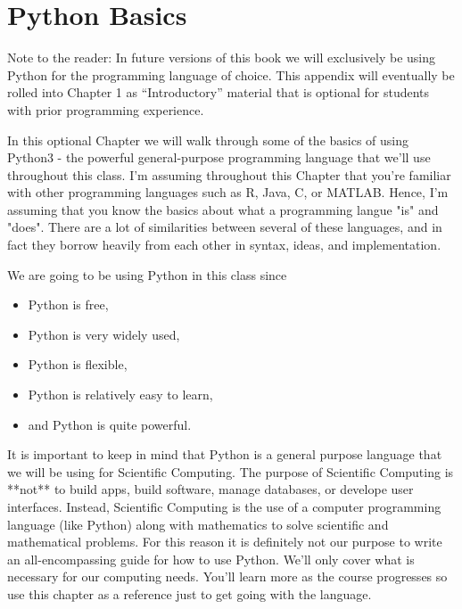 \chapter{Python Basics}\label{app:coding}

Note to the reader: In future versions of this book we will exclusively be using Python
for the programming language of choice.  This appendix will eventually be rolled into
Chapter 1 as ``Introductory'' material that is optional for students with prior
programming experience.

In this optional Chapter we will walk through some of the basics of using Python3 - the powerful general-purpose programming language that we'll use throughout this class.  I'm assuming throughout this Chapter that you're familiar with other programming languages such as R, Java, C, or MATLAB.  Hence, I'm assuming that you know the basics about what a programming langue "is" and "does".  There are a lot of similarities between several of these languages, and in fact they borrow heavily from each other in syntax, ideas, and implementation.

We are going to be using Python in this class since

\begin{itemize}
    \item Python is free,
    \item Python is very widely used,
    \item Python is flexible,
    \item Python is relatively easy to learn,
    \item and Python is quite powerful.
\end{itemize}

It is important to keep in mind that Python is a general purpose language that we will be using for Scientific Computing.  The purpose of Scientific Computing is **not** to build apps, build software, manage databases, or develope user interfaces.  Instead, Scientific Computing is the use of a computer programming language (like Python) along with mathematics to solve scientific and mathematical problems.  For this reason it is definitely not our purpose to write an all-encompassing guide for how to use Python.  We'll only cover what is necessary for our computing needs.  You'll learn more as the course progresses so use this chapter as a reference just to get going with the language.

